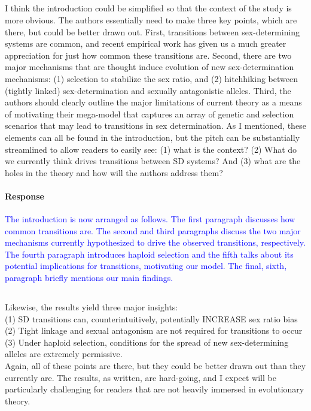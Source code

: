 \documentclass[10pt,letterpaper]{article}
\begin{document}
\noindent\subsection{}
I think the introduction could be simplified so that the context of the study is more obvious. The authors essentially need to make three key points, which are there, but could be better drawn out. First, transitions between sex-determining systems are common, and recent empirical work has given us a much greater appreciation for just how common these transitions are. Second, there are two major mechanisms that are thought induce evolution of new sex-determination mechanisms: (1) selection to stabilize the sex ratio, and (2) hitchhiking between (tightly linked) sex-determination and sexually antagonistic alleles. Third, the authors should clearly outline the major limitations of current theory as a means of motivating their mega-model that captures an array of genetic and selection scenarios that may lead to transitions in sex determination. As I mentioned, these elements can all be found in the introduction, but the pitch can be substantially streamlined to allow readers to easily see: (1) what is the context? (2) What do we currently think drives transitions between SD systems? And (3) what are the holes in the theory and how will the authors address them?

\noindent\paragraph{Response}
\textcolor{blue}{The introduction is now arranged as follows. The first paragraph discusses how common transitions are. The second and third paragraphs discuss the two major mechanisms currently hypothesized to drive the observed transitions, respectively. The fourth paragraph introduces haploid selection and the fifth talks about its potential implications for transitions, motivating our model. The final, sixth, paragraph briefly mentions our main findings.}

\noindent\subsection{}
Likewise, the results yield three major insights:\\
(1) SD transitions can, counterintuitively, potentially INCREASE sex ratio bias\\
(2) Tight linkage and sexual antagonism are not required for transitions to occur\\
(3) Under haploid selection, conditions for the spread of new sex-determining alleles are extremely permissive.\\
Again, all of these points are there, but they could be better drawn out than they currently are. The results, as written, are hard-going, and I expect will be particularly challenging for readers that are not heavily immersed in evolutionary theory.
\end{document}
